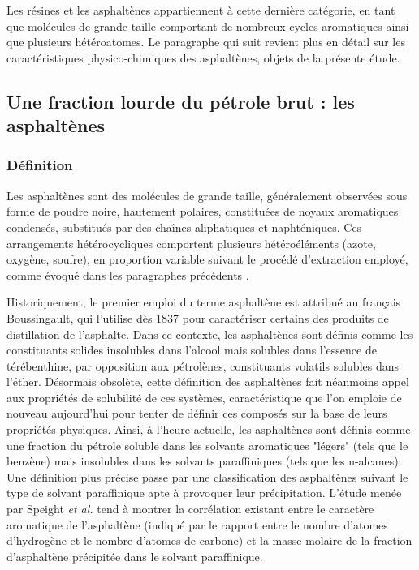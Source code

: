 \documentclass[12pt,a4paper]{book}
\begin{document}
Les résines et les asphaltènes appartiennent à cette dernière catégorie, en tant que molécules de grande taille comportant de nombreux cycles aromatiques ainsi que plusieurs hétéroatomes. Le paragraphe qui suit revient plus en détail sur les caractéristiques physico-chimiques des asphaltènes, objets de la présente étude. 

\subsection{Une fraction lourde du pétrole brut : les asphaltènes}


\subsubsection{Définition}

Les asphaltènes sont des molécules de grande taille, généralement observées sous forme de poudre noire, hautement polaires, constituées de noyaux aromatiques condensés, substitués par des chaînes aliphatiques et naphténiques. Ces arrangements hétérocycliques comportent plusieurs hétéroéléments (azote, oxygène, soufre), en proportion variable suivant le procédé d'extraction employé, comme évoqué dans les paragraphes précédents \cite{calles2007properties}. 

Historiquement, le premier emploi du terme \og asphaltène \fg{} est attribué au français Boussingault, qui l'utilise dès 1837 pour caractériser certains des produits de distillation de l'asphalte\cite{goual2012petroleum}. Dans ce contexte, les \og asphaltènes \fg{} sont définis comme les constituants solides insolubles dans l'alcool mais solubles dans l'essence de térébenthine, par opposition aux \og pétrolènes\fg, constituants volatils solubles dans l'éther.
Désormais obsolète, cette définition des asphaltènes fait néanmoins appel aux propriétés de solubilité de ces systèmes, caractéristique que l'on emploie de nouveau aujourd'hui pour tenter de définir ces composés sur la base de leurs propriétés physiques. Ainsi, à l'heure actuelle, les asphaltènes sont définis comme une fraction du pétrole soluble dans les solvants aromatiques "légers" (tels que le benzène) mais insolubles dans les solvants paraffiniques (tels que les n-alcanes). Une définition plus précise passe par une classification des asphaltènes suivant le type de solvant paraffinique apte à provoquer leur précipitation. L'étude menée par Speight \textit{et al.} \cite{speight2004petroleum} tend à montrer la corrélation existant entre le caractère aromatique de l'asphaltène (indiqué par le rapport entre le nombre d'atomes d'hydrogène et le nombre d'atomes de carbone) et la masse molaire de la fraction d'asphaltène précipitée dans le solvant paraffinique.  
\end{document}
